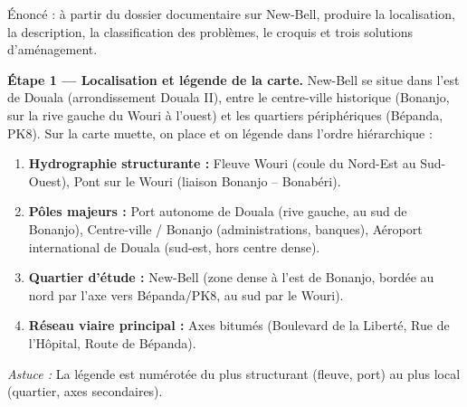 \documentclass[11pt]{article}
\begin{document}
\begin{exoresolu}
Énoncé : à partir du dossier documentaire sur New-Bell, produire la localisation, la description, la classification des problèmes, le croquis et trois solutions d'aménagement.

\tcblower

\textbf{Étape 1 — Localisation et légende de la carte.}
New-Bell se situe dans l'est de Douala (arrondissement Douala II), entre le centre-ville historique (Bonanjo, sur la rive gauche du Wouri à l'ouest) et les quartiers périphériques (Bépanda, PK8). Sur la carte muette, on place et on légende dans l'ordre hiérarchique :
\begin{enumerate}
\item \textbf{Hydrographie structurante :} Fleuve Wouri (coule du Nord-Est au Sud-Ouest), Pont sur le Wouri (liaison Bonanjo -- Bonabéri).
\item \textbf{Pôles majeurs :} Port autonome de Douala (rive gauche, au sud de Bonanjo), Centre-ville / Bonanjo (administrations, banques), Aéroport international de Douala (sud-est, hors centre dense).
\item \textbf{Quartier d'étude :} New-Bell (zone dense à l'est de Bonanjo, bordée au nord par l'axe vers Bépanda/PK8, au sud par le Wouri).
\item \textbf{Réseau viaire principal :} Axes bitumés (Boulevard de la Liberté, Rue de l'Hôpital, Route de Bépanda).
\end{enumerate}
\emph{Astuce :} La légende est numérotée du plus structurant (fleuve, port) au plus local (quartier, axes secondaires).


\end{exoresolu}
\end{document}
